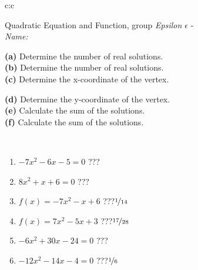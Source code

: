 \documentclass[10pt]{report}
\begin{document}
\begin{tabular}{c:c}
\begin{minipage}[c][104.5mm][t]{0.5\linewidth}
\begin{center}
\vspace{7mm}
{\huge {\LARGE Quadratic Equation and Function}, group \textit{Epsilon $\epsilon$} -}\\[5mm]
\textit{Name:}\phantom{xxxxxxxxxxxxxxxxxxxxxxxxxxxxxxxxxxxxxxxxxxxxxxxxxxxxxxxxxxxxxxxxx}\\[5mm]
\begin{minipage}{0.95\linewidth}
\begin{center}
{\small \begin{minipage}{0.5\textwidth}
\textbf{(a)} Determine the number of real solutions. \\[1mm]
\textbf{(b)} Determine the number of real solutions. \\[1mm]
\textbf{(c)} Determine the x-coordinate of the vertex.
\end{minipage} \begin{minipage}{0.49\textwidth}
\textbf{(d)} Determine the y-coordinate of the vertex. \\[1mm]
\textbf{(e)} Calculate the sum of the solutions. \\[1mm]
\textbf{(f)} Calculate the sum of the solutions.
\end{minipage}
}
\end{center}
\end{minipage}
\\[4mm]
\begin{minipage}{0.79\linewidth}
\begin{center}
\begin{varwidth}{\linewidth}
\begin{enumerate}
\Large
\item $-7x^2-6x-5=0$\quad \dotfill\; ???\;\dotfill {}
\item $8x^2+x+6=0$\quad \dotfill\; ???\;\dotfill {}
\item $f(x)=-7x^2-x+6$\quad \dotfill\; ???\;\dotfill \quad $\nicefrac{1}{14}$
\item $f(x)=7x^2-5x+3$\quad \dotfill\; ???\;\dotfill \quad $\nicefrac{17}{28}$
\item $-6x^2+30x-24=0$\quad \dotfill\; ???\;\dotfill {}
\item $-12x^2-14x-4=0$\quad \dotfill\; ???\;\dotfill \quad $\nicefrac{1}{6}$
\end{enumerate}
\end{varwidth}

\end{center}
\end{minipage}
\end{center}
\end{minipage}
\end{tabular}
\end{document}
